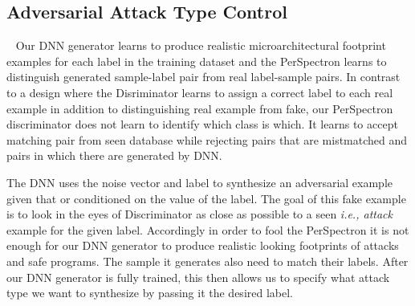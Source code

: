 




 




\subsection{Adversarial Attack Type Control}~\label{TypeControl}
 Our DNN generator learns to produce realistic microarchitectural footprint examples for each label in the training dataset and the PerSpectron learns to distinguish generated sample-label pair from real label-sample pairs.   
 In contrast to a design where the Disriminator learns to assign a correct label to each real example in addition to distinguishing real example from fake, our PerSpectron discriminator does not learn to identify which class is which.  It learns to accept matching pair from seen database while rejecting pairs that are mistmatched and pairs in which there are generated by DNN. 
 
 The DNN uses the noise vector and label to synthesize an adversarial example given that or conditioned on the value of the label. The goal of this fake example is to look in the eyes of Discriminator as close as possible to a seen {\em i.e., attack} example for the given label.  
 Accordingly in order to fool the PerSpectron it is not enough for our DNN generator to produce realistic looking footprints of attacks and safe programs. The sample it generates also need to match their labels. After our DNN generator is fully trained, this then allows us to specify what attack type we want to synthesize by passing it the desired label. 
 
